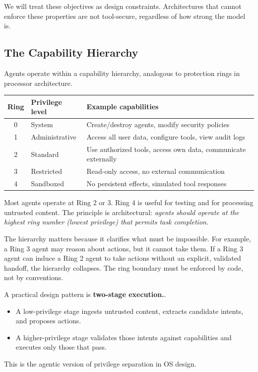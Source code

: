 We will treat these objectives as design constraints. Architectures that cannot enforce these properties are not tool-secure, regardless of how strong the model is.

\subsection{The Capability Hierarchy}

Agents operate within a capability hierarchy, analogous to protection rings in processor architecture.

\begin{center}
\begin{tabular}{clp{6cm}}
\toprule
Ring & Privilege level & Example capabilities \\
\midrule
0 & System & Create/destroy agents, modify security policies \\
1 & Administrative & Access all user data, configure tools, view audit logs \\
2 & Standard & Use authorized tools, access own data, communicate externally \\
3 & Restricted & Read-only access, no external communication \\
4 & Sandboxed & No persistent effects, simulated tool responses \\
\bottomrule
\end{tabular}
\end{center}

Most agents operate at Ring 2 or 3. Ring 4 is useful for testing and for processing untrusted content. The principle is architectural: \textit{agents should operate at the highest ring number (lowest privilege) that permits task completion}.

The hierarchy matters because it clarifies what must be impossible. For example, a Ring 3 agent may reason about actions, but it cannot take them. If a Ring 3 agent can induce a Ring 2 agent to take actions without an explicit, validated handoff, the hierarchy collapses. The ring boundary must be enforced by code, not by conventions.

A practical design pattern is \textbf{two-stage execution.}.
\begin{itemize}
\item A low-privilege stage ingests untrusted content, extracts candidate intents, and proposes actions.
\item A higher-privilege stage validates those intents against capabilities and executes only those that pass.
\end{itemize}
This is the agentic version of privilege separation in OS design.

